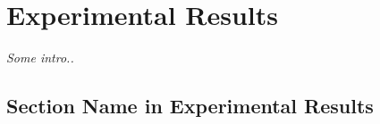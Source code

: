 \setlength{\footskip}{8mm}

\chapter{Experimental Results}
\label{ch:results}

\textit{Some intro..}

\section{Section Name in Experimental Results}
\label{section-name-in-experimental-results}




\FloatBarrier

